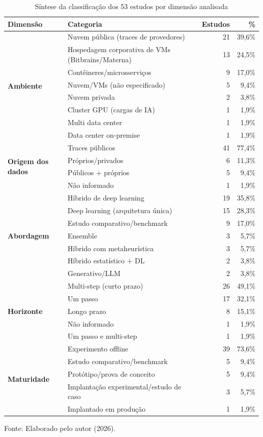\begin{table}[htbp]
\centering
\caption{Síntese da classificação dos 53 estudos por dimensão analisada}
\label{tab:map-sintese}
\footnotesize
\begin{tabular}{llrr}
\toprule
\textbf{Dimensão} & \textbf{Categoria} & \textbf{Estudos} & \textbf{\%} \\
\midrule
\multirow{8}{*}{\textbf{Ambiente}} & Nuvem pública (traces de provedores) & 21 & 39,6\% \\
 & Hospedagem corporativa de VMs (Bitbrains/Materna) & 13 & 24,5\% \\
 & Contêineres/microsserviços & 9 & 17,0\% \\
 & Nuvem/VMs (não especificado) & 5 & 9,4\% \\
 & Nuvem privada & 2 & 3,8\% \\
 & Cluster GPU (cargas de IA) & 1 & 1,9\% \\
 & Multi data center & 1 & 1,9\% \\
 & Data center on-premise & 1 & 1,9\% \\
\midrule
\multirow{4}{*}{\textbf{Origem dos dados}} & Traces públicos & 41 & 77,4\% \\
 & Próprios/privados & 6 & 11,3\% \\
 & Públicos + próprios & 5 & 9,4\% \\
 & Não informado & 1 & 1,9\% \\
\midrule
\multirow{7}{*}{\textbf{Abordagem}} & Híbrido de deep learning & 19 & 35,8\% \\
 & Deep learning (arquitetura única) & 15 & 28,3\% \\
 & Estudo comparativo/benchmark & 9 & 17,0\% \\
 & Ensemble & 3 & 5,7\% \\
 & Híbrido com metaheurística & 3 & 5,7\% \\
 & Híbrido estatístico + DL & 2 & 3,8\% \\
 & Generativo/LLM & 2 & 3,8\% \\
\midrule
\multirow{5}{*}{\textbf{Horizonte}} & Multi-step (curto prazo) & 26 & 49,1\% \\
 & Um passo & 17 & 32,1\% \\
 & Longo prazo & 8 & 15,1\% \\
 & Não informado & 1 & 1,9\% \\
 & Um passo e multi-step & 1 & 1,9\% \\
\midrule
\multirow{5}{*}{\textbf{Maturidade}} & Experimento offline & 39 & 73,6\% \\
 & Estudo comparativo/benchmark & 5 & 9,4\% \\
 & Protótipo/prova de conceito & 5 & 9,4\% \\
 & Implantação experimental/estudo de caso & 3 & 5,7\% \\
 & Implantado em produção & 1 & 1,9\% \\
\bottomrule
\end{tabular}
\par\medskip
Fonte: Elaborado pelo autor (2026).
\end{table}
